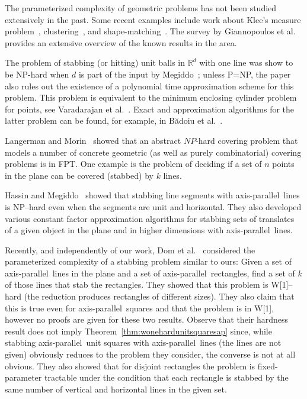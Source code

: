 \documentclass[12pt]{article}
\newcommand{\cclass}[1]{{#1}}
\newcommand{\fpt}{\cclass{FPT}}
\newcommand{\wone}{\cclass{W[1]}}
\newcommand{\ap}{a.p.\ }
\renewcommand{\ap}{axis-parallel\ }
\newcommand{\Rd}{\mathbb{R}^d}
\begin{document}
The parameterized complexity of geometric problems has not been studied
extensively in the past. Some recent examples include work about Klee's
measure problem~\cite{1377693}, clustering~\cite{CGKR08, marx-esa2005}, and
shape-matching~\cite{CGK06}. The survey by Giannopoulos et al.~\cite{DBLP:journals/cj/GiannopoulosKW08} 
provides an extensive overview of
the known results in the area.

The problem of stabbing (or hitting) unit balls in $\Rd$ with one line was
show to be NP-hard when $d$ is part of the input by Megiddo~\cite{Megiddo90onthe}; unless P=NP, the paper
also rules out the existence of a polynomial time approximation scheme for
this problem. This problem is equivalent to the minimum enclosing cylinder problem for points, see Varadarajan et al.~\cite{VVYZ07}. 
Exact and approximation algorithms for the latter problem can be found, for example, 
in B\u{a}doiu et al.~\cite{BHI02}.

Langerman and Morin~\cite{DBLP:journals/dcg/LangermanM05} showed that an abstract $NP$-hard
covering problem that models a number of concrete geometric (as well as
purely combinatorial) covering problems is in \fpt. One example is the
problem of deciding if a set of $n$ points in the plane can be covered
(stabbed) by $k$ lines.

Hassin and Megiddo~\cite{HM91} showed that stabbing line segments with \ap lines is NP--hard even when the 
segments are unit and horizontal. They also developed various constant factor approximation algorithms
for stabbing sets of translates of a given object in the plane and in higher dimensions with \ap lines.

Recently, and independently of our work, 
Dom et al.~\cite{DFR09} considered the parameterized complexity of a stabbing problem similar to ours:
Given a set of \ap lines in the plane and a set of \ap rectangles, find a set of $k$ of those lines that
stab the rectangles. They showed that this problem is \wone--hard (the reduction produces rectangles of different sizes). 
They also claim that this is true even for \ap squares and 
that the problem is in W[1], however no proofs are given for these two results. Observe that 
their hardness result does not imply Theorem~\ref{thm:wonehardunitsquaresap} since, while stabbing \ap unit squares with \ap lines 
(the lines are not given) obviously reduces to the problem they consider, the converse is not at all obvious.
They also showed that for disjoint rectangles the problem is fixed-parameter tractable under the condition that each rectangle is 
stabbed by the same number of vertical and horizontal lines in the given set.
  
\end{document}
